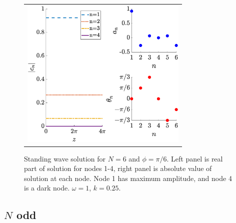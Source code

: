 \documentclass[reprint, amsmath,amssymb,aps,pra]{revtex4-2}
\begin{document}
\begin{figure}
\begin{center}
\begin{tabular}{c}
\includegraphics[width=8cm]{evenhole6.eps}
\end{tabular}
\end{center}
\caption{Standing wave solution for $N = 6$ and $\phi = \pi/6$. Left panel is real part of solution for nodes 1-4, right panel is absolute value of solution at each node. Node 1 has maximum amplitude, and node 4 is a dark node. $\omega = 1$, $k = 0.25$.}
\label{fig:evenhole6}
\end{figure}

\subsection{\texorpdfstring{$N$}{N} odd}\label{sec:Nodd}
\end{document}
